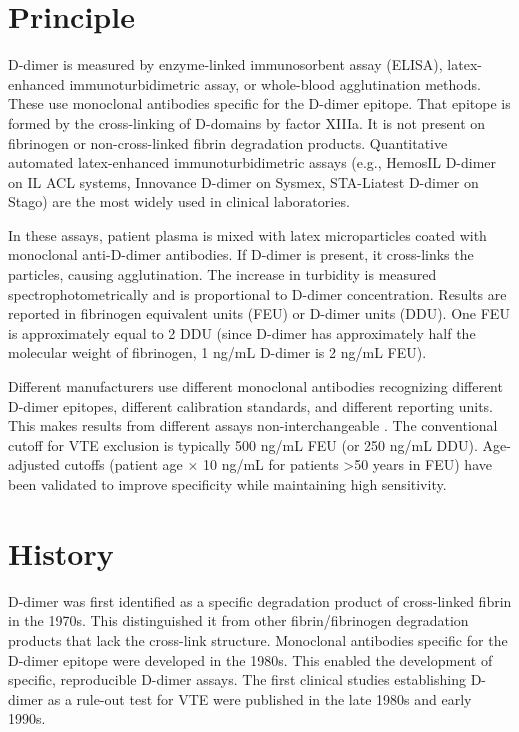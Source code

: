 \section*{Principle}
D-dimer is measured by enzyme-linked immunosorbent assay (ELISA), latex-enhanced immunoturbidimetric assay, or whole-blood agglutination methods. These use monoclonal antibodies specific for the D-dimer epitope. That epitope is formed by the cross-linking of D-domains by factor XIIIa. It is not present on fibrinogen or non-cross-linked fibrin degradation products. Quantitative automated latex-enhanced immunoturbidimetric assays (e.g., HemosIL D-dimer on IL ACL systems, Innovance D-dimer on Sysmex, STA-Liatest D-dimer on Stago) are the most widely used in clinical laboratories.

In these assays, patient plasma is mixed with latex microparticles coated with monoclonal anti-D-dimer antibodies. If D-dimer is present, it cross-links the particles, causing agglutination. The increase in turbidity is measured spectrophotometrically and is proportional to D-dimer concentration. Results are reported in fibrinogen equivalent units (FEU) or D-dimer units (DDU). One FEU is approximately equal to 2 DDU (since D-dimer has approximately half the molecular weight of fibrinogen, 1 ng/mL D-dimer is 2 ng/mL FEU).

Different manufacturers use different monoclonal antibodies recognizing different D-dimer epitopes, different calibration standards, and different reporting units. This makes results from different assays non-interchangeable \cite{tietz2023textbook}. The conventional cutoff for VTE exclusion is typically 500 ng/mL FEU (or 250 ng/mL DDU). Age-adjusted cutoffs (patient age $\times$ 10 ng/mL for patients >50 years in FEU) have been validated to improve specificity while maintaining high sensitivity.

\section*{History}
D-dimer was first identified as a specific degradation product of cross-linked fibrin in the 1970s. This distinguished it from other fibrin/fibrinogen degradation products that lack the cross-link structure. Monoclonal antibodies specific for the D-dimer epitope were developed in the 1980s. This enabled the development of specific, reproducible D-dimer assays. The first clinical studies establishing D-dimer as a rule-out test for VTE were published in the late 1980s and early 1990s.

